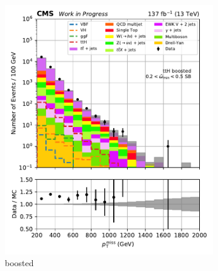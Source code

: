 \begin{figure}[htbp]
    \centering
    \begin{subfigure}[b]{0.24\textwidth}
        \includegraphics[width=\textwidth]{figures/region_plots/2016to18/sideband_4/ttH_boosted.pdf}
        \caption{\ttH boosted}
    \end{subfigure}
    \hfill
    \begin{subfigure}[b]{0.24\textwidth}

\end{subfigure}
\end{figure}
